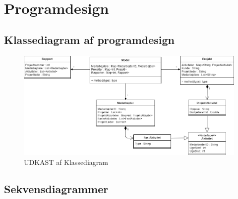 \section{Programdesign}
\subsection{Klassediagram af programdesign}
\begin{figure}[H]
    \centering
    \caption{UDKAST af Klassediagram}\label{fig:ClassDiag}
    \includegraphics[width = .75\textwidth]{Diagrams/Klassediagram.png}
\end{figure}
\subsection{Sekvensdiagrammer}